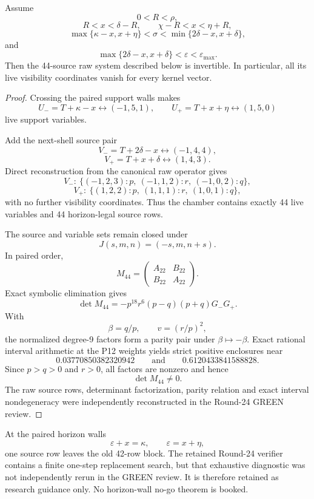 \begin{proposition}
\label{prop:p12-r24-c44}
Assume
\[
0<R<\rho,
\]
\[
R<x<\delta-R,
\qquad
\chi-R<x<\eta+R,
\]
\[
\max\{\kappa-x,x+\eta\}<\sigma<\min\{2\delta-x,x+\delta\},
\]
and
\[
\max\{2\delta-x,x+\delta\}<\varepsilon<\varepsilon_{\max}.
\]
Then the 44-source raw system described below is invertible. In particular,
all its live visibility coordinates vanish for every kernel vector.
\end{proposition}

\begin{proof}
Crossing the paired support walls makes
\[
U_-=T+\kappa-x\leftrightarrow(-1,5,1),
\qquad
U_+=T+x+\eta\leftrightarrow(1,5,0)
\]
live support variables.

Add the next-shell source pair
\[
V_-=T+2\delta-x\leftrightarrow(-1,4,4),
\]
\[
V_+=T+x+\delta\leftrightarrow(1,4,3).
\]
Direct reconstruction from the canonical raw operator gives
\[
V_-:\ \{(-1,2,3):p,\ (-1,1,2):r,\ (-1,0,2):q\},
\]
\[
V_+:\ \{(1,2,2):p,\ (1,1,1):r,\ (1,0,1):q\},
\]
with no further visibility coordinates. Thus the chamber contains exactly
44 live variables and 44 horizon-legal source rows.

The source and variable sets remain closed under
\[
J(s,m,n)=(-s,m,n+s).
\]
In paired order,
\[
M_{44}=\begin{pmatrix}A_{22}&B_{22}\\B_{22}&A_{22}\end{pmatrix}.
\]
Exact symbolic elimination gives
\[
\boxed{
\det M_{44}
=-p^{18}r^6(p-q)(p+q)G_-G_+.
}
\]
With
\[
\beta=q/p,\qquad v=(r/p)^2,
\]
the normalized degree-9 factors form a parity pair under
\(\beta\mapsto-\beta\). Exact rational interval arithmetic at the P12
weights yields strict positive enclosures near
\[
0.03770850382320942
\qquad\text{and}\qquad
0.6120433841588828.
\]
Since \(p>q>0\) and \(r>0\), all factors are nonzero and hence
\[
\det M_{44}\ne0.
\]
The raw source rows, determinant factorization, parity relation and exact
interval nondegeneracy were independently reconstructed in the Round-24
GREEN review.
\end{proof}

\begin{remark}
At the paired horizon walls
\[
\varepsilon+x=\kappa,
\qquad
\varepsilon=x+\eta,
\]
one source row leaves the old 42-row block. The retained Round-24 verifier
contains a finite one-step replacement search, but that exhaustive diagnostic
was not independently rerun in the GREEN review. It is therefore retained as
research guidance only. No horizon-wall no-go theorem is booked.
\end{remark}
